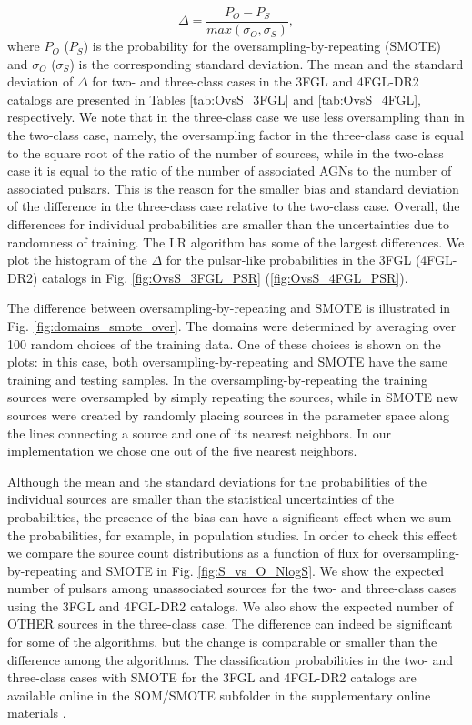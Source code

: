 \documentclass[referee]{aa} %
\newcommand{\be}{\begin{equation}}
\newcommand{\ee}{\end{equation}}
\newcommand{\lb}{\label}
\begin{document}
\begin{appendix}
\be
\lb{eq:OS_diff}
\Delta = \frac{P_O - P_S}{max(\sigma_{O},\sigma_{S})},
\ee
where $P_O$ ($P_S$) is the probability for the oversampling-by-repeating (SMOTE) and $\sigma_O$ ($\sigma_S$) is the corresponding standard deviation. 
The mean and the standard deviation of $\Delta$ for two- and three-class cases in the 3FGL and 4FGL-DR2 catalogs are presented in 
Tables \ref{tab:OvsS_3FGL} and \ref{tab:OvsS_4FGL}, respectively.
We note that in the three-class case we use less oversampling than in the two-class case, namely, the oversampling factor in the three-class case is equal to the square root of the ratio of the number of sources, while in the two-class case it is equal to the ratio of the number of associated AGNs to the number of associated pulsars.
This is the reason for the smaller bias and standard deviation of the difference in the three-class case relative to the two-class case.
Overall, the differences for individual probabilities are smaller than the uncertainties due to randomness of training.
The LR algorithm has some of the largest differences.
We plot the histogram of the $\Delta$ for the pulsar-like probabilities in the 3FGL (4FGL-DR2) catalogs in Fig. \ref{fig:OvsS_3FGL_PSR}
(\ref{fig:OvsS_4FGL_PSR}).



The difference between oversampling-by-repeating and SMOTE is illustrated in Fig. \ref{fig:domains_smote_over}.
The domains were determined by averaging over 100 random choices of the training data.
One of these choices is shown on the plots: in this case, both oversampling-by-repeating and SMOTE have the same 
training and testing samples.
In the oversampling-by-repeating the training sources were oversampled by simply repeating the sources,
while in SMOTE new sources were created by randomly placing sources in the parameter space along the lines connecting a source
and one of its nearest neighbors. In our implementation we chose one out of the five nearest neighbors. 




Although the mean and the standard deviations for the probabilities of the individual sources are smaller than the 
statistical uncertainties of the probabilities, the presence of the bias can have a significant effect when we sum the probabilities, for example, in population studies.
In order to check this effect we compare the source count distributions as a function of flux for oversampling-by-repeating and SMOTE 
in Fig. \ref{fig:S_vs_O_NlogS}.
We show the expected number of pulsars among unassociated sources for the two- and three-class cases using the 3FGL and 4FGL-DR2 catalogs.
We also show the expected number of OTHER sources in the three-class case.
The difference can indeed be significant for some of the algorithms, but the change is comparable or smaller than the difference among the algorithms.
The classification probabilities in the two- and three-class cases with SMOTE for the 3FGL and 4FGL-DR2 catalogs 
are available online in the SOM/SMOTE subfolder in the supplementary online materials \citep{SOM_material}.



\end{appendix}
\end{document}
